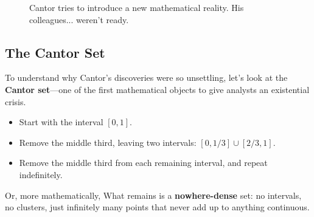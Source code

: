 \begin{figure}[H]
\centering
{}
\caption{Cantor tries to introduce a new mathematical reality. His colleagues... weren’t ready.}
\end{figure}







\subsection{The Cantor Set }

To understand why Cantor’s discoveries were so unsettling, let’s look at the \textbf{Cantor set}—one of the first mathematical objects to give analysts an existential crisis.

\begin{itemize}
    \item Start with the interval \( [0,1] \).
    \item Remove the middle third, leaving two intervals: \( [0,1/3] \cup [2/3,1] \).
    \item Remove the middle third from each remaining interval, and repeat indefinitely.
\end{itemize}

Or, more mathematically, What remains is a \textbf{nowhere-dense} set: no intervals, no clusters, just infinitely many points that never add up to anything continuous.

